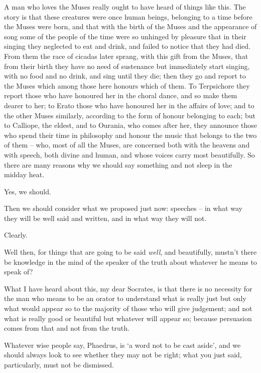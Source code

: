 A man who loves the Muses really ought to have  heard
of things like this. The story is that these creatures were once human
beings, belonging to a time before the Muses were born, and that with
the birth of the Muses and the appearance of song some of the people of
the time were so unhinged by pleasure that in their singing they
neglected to eat and drink,  and failed to notice that they had
died. From them the race of cicadas later sprang, with this gift from
the Muses, that from their birth they have no need of sustenance but
immediately start singing, with no food and no drink, and sing until
they  die; then they go and report to the Muses which among
those here honours which of them. To Terpsichore they report those who
have honoured her in the choral dance, and so make them  dearer
to her; to Erato those who have honoured her in the affairs of love; and
to the other Muses similarly, according to the form of honour belonging
to each; but to Calliope, the eldest, and to Ourania, who comes after
her, they announce those who spend their time in philosophy and honour
the music  that belongs to the two of them -- who, most of all
the Muses, are concerned both with the heavens and with
speech, both divine and
human, and whose voices carry most beautifully. So there are many
reasons why we should say something and not sleep in the midday heat.

Yes, we should.

 Then we should consider what we proposed just now:
speeches -- in what way they will be well said and written, and in what
way they will not.

Clearly.

Well then, for things that are going to be said {\em well}, and
beautifully, mustn't there be knowledge in the mind of the speaker of
the truth about whatever he means to speak of?

What I have heard about this, my dear Socrates, is 
that there is no necessity for the man who means to be an orator to
understand what is really just but only what would appear so to the
majority of those who will give judgement; and not what is really good
or beautiful but whatever will appear so; because persuasion comes from
that and not from the truth.

 Whatever wise people say, Phaedrus, is ‘a word not to
be cast aside', and we
should always look to see whether they may not be right; what you just
said, particularly, must not be dismissed.

